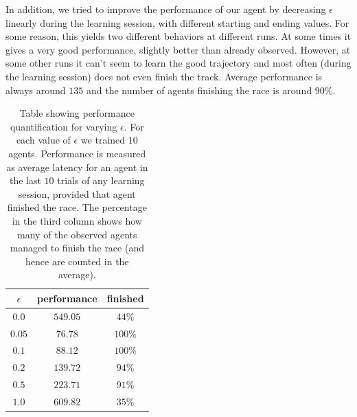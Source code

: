 In addition, we tried to improve the performance of our agent by decreasing
$\epsilon$ linearly during the learning session, with different starting and
ending values. For some reason, this yields two different behaviors at different
runs. At some times it gives a very good performance, slightly better than
already observed. However, at some other runs it can't seem to learn the good
trajectory and most often (during the learning session) does not even finish the
track. Average performance is always around $135$ and the number of agents
finishing the race is around $90\%$.

\begin{table}[h!]
\centering
\begin{tabular}{|c|c|c|}
\hline
$\epsilon$ & performance & finished \\
\hline
$0.0$ & $549.05$ & $44\%$\\
\hline
$0.05$ & $76.78$ & $100\%$ \\
\hline
$0.1$ & $88.12$ & $100\%$ \\
\hline
$0.2$ & $139.72$ & $94\%$ \\
\hline
$0.5$ & $223.71$ & $91\%$ \\
\hline
$1.0$ & $609.82$ & $35\%$ \\
\hline
\end{tabular}
\caption{\label{tab:perf}Table showing performance quantification for varying
$\epsilon$. For each value of $\epsilon$ we trained $10$ agents. Performance is
measured as average latency for an agent in the last $10$ trials of any learning
session, provided that agent finished the race. The percentage in the third
column shows how many of the observed agents managed to finish the race (and
hence are counted in the average).}
\end{table}

